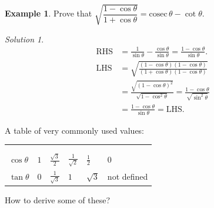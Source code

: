 \documentclass[
  12pt,
  oneside]{book}
\theoremstyle{definition}
\theoremstyle{definition}
\newtheorem{example}{Example}[chapter]
\theoremstyle{definition}
\theoremstyle{definition}
\theoremstyle{remark}
\newtheorem*{solution}{Solution}
\begin{document}
\begin{example}
Prove that \(\sqrt{\dfrac{1-\cos\theta}{1+\cos\theta}} = \mathrm{cosec}\,\theta-\cot\theta\).
\end{example}

\begin{solution}
\begin{align*}
\mathrm{RHS} &= \frac{1}{\sin\theta}-\frac{\cos\theta}{\sin\theta}= \frac{1-\cos\theta}{\sin\theta}.\\
\mathrm{LHS} &= \sqrt{\frac{(1-\cos\theta)(1-\cos\theta)}{(1+\cos\theta)(1-\cos\theta)}} \\
&= \frac{\sqrt{(1-\cos\theta)^2}}{\sqrt{1-\cos^2\theta}} = \frac{1-\cos\theta}{\sqrt{\sin^2\theta}}\\
&= \frac{1-\cos\theta}{\sin\theta} = \mathrm{LHS}.
\end{align*}
\end{solution}

A table of very commonly used values:

\begin{longtable}[]{@{}
  >{\raggedright\arraybackslash}p{}
  >{\centering\arraybackslash}p{}
  >{\centering\arraybackslash}p{}
  >{\centering\arraybackslash}p{}
  >{\centering\arraybackslash}p{}
  >{\centering\arraybackslash}p{}@{}}
\toprule\noalign{}
\endhead
\bottomrule\noalign{}
\endlastfoot
\multirow{2}{*}{\(\theta\)
:---------------
\(\sin\theta\)} & \multirow{2}{*}{\(0\)
:-----:
\(0\)} & \multirow{2}{*}{\(\frac{\pi}6\)
:------------------:
\(\frac12\)} & \multirow{2}{*}{\(\frac{\pi}4\)
:------------------:
\(\frac1{\sqrt2}\)} & \multirow{2}{*}{\(\frac{\pi}3\)
:------------------:
\(\frac{\sqrt3}2\)} & \multirow{2}{*}{\(\frac{\pi}2\)
:---------------:
\(1\)} \\
 \\
\(\cos\theta\) & \(1\) & \(\frac{\sqrt3}2\) & \(\frac1{\sqrt2}\) & \(\frac12\) & \(0\) \\
\(\tan\theta\) & \(0\) & \(\frac1{\sqrt3}\) & \(1\) & \(\sqrt3\) & not defined \\
\end{longtable}

How to derive some of these?
\end{document}
